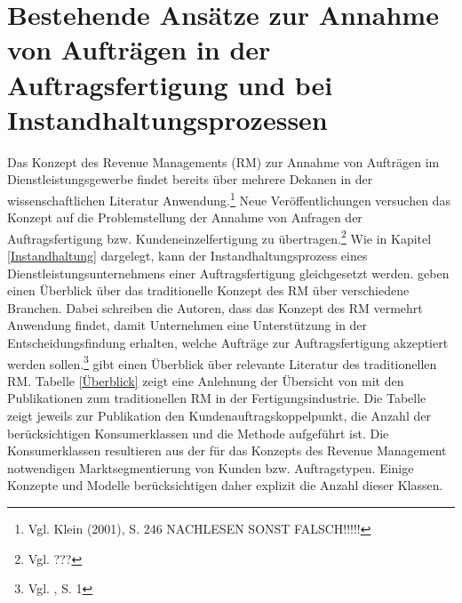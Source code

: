\chapter{Bestehende Ansätze zur Annahme von Aufträgen in der Auftragsfertigung und bei Instandhaltungsprozessen}
\setcounter{footnote}{4}  %

Das Konzept des Revenue Managements (RM) zur Annahme von Aufträgen im Dienstleistungsgewerbe findet bereits über mehrere Dekanen in der wissenschaftlichen Literatur Anwendung.\footnote{Vgl. Klein (2001), S. 246 NACHLESEN SONST FALSCH!!!!!} Neue Veröffentlichungen versuchen das Konzept auf die Problemstellung der Annahme von Anfragen der Auftragsfertigung bzw. Kundeneinzelfertigung zu übertragen.\footnote{Vgl. ???} Wie in Kapitel \ref{Instandhaltung} dargelegt, kann der Instandhaltungsprozess eines Dienstleistungsunternehmens einer Auftragsfertigung gleichgesetzt werden. \cite{kimms2005revenue} geben einen Überblick über das traditionelle Konzept des RM über verschiedene Branchen. Dabei schreiben die Autoren, dass das Konzept des RM vermehrt Anwendung findet, damit Unternehmen eine Unterstützung in der Entscheidungsfindung erhalten, welche Aufträge zur Auftragsfertigung akzeptiert werden sollen.\footnote{Vgl. \cite{kimms2005revenue}, S. 1} \cite{quante2009management} gibt einen Überblick über relevante Literatur des traditionellen RM. Tabelle \ref{Überblick} zeigt eine Anlehnung der Übersicht von \cite{quante2009management} mit den Publikationen zum traditionellen RM in der Fertigungsindustrie. Die Tabelle zeigt jeweils zur Publikation den Kundenauftragskoppelpunkt, die Anzahl der berücksichtigen Konsumerklassen und die Methode aufgeführt ist. Die Konsumerklassen resultieren aus der für das Konzepts des Revenue Management notwendigen Marktsegmentierung von Kunden bzw. Auftragstypen. Einige Konzepte und Modelle berücksichtigen daher explizit die Anzahl dieser Klassen.


